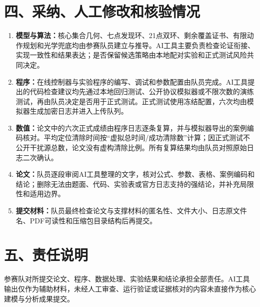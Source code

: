 \documentclass[UTF8,a4paper,zihao=-4,fontset=fandol]{ctexart}
\begin{document}
\section*{四、采纳、人工修改和核验情况}
\begin{enumerate}
\item \textbf{模型与算法：}核心集合几何、七点发现环、21点双环、剩余覆盖证书、有限动作规划和光学兜底均由参赛队员建立与推导。AI工具主要负责检查论证衔接、实现一致性和结果表达；是否保留候选策略由本地配对实验和正式测试风险共同决定。
\item \textbf{程序：}在线控制器与实验程序的编写、调试和参数配置由队员完成。AI工具提出的代码检查建议均先通过本地回归测试、公开协议模拟器或不限次数的演练测试，再由队员决定是否用于正式测试。正式测试使用冻结配置，六次均由模拟器生成加密日志并进入上传队列。
\item \textbf{数值：}论文中的六次正式成绩由程序日志逐条复算，并与模拟器导出的案例编码核对。平均定位清除时间按“虚拟总时间/成功清除数”计算；因正式测试不公开干扰源总数，论文没有虚构清除比例。所有复算结果均由队员对照原始日志二次确认。
\item \textbf{论文：}队员逐段审阅AI工具整理的文字，核对公式、参数、表格、案例编码和结论；删除无法由题面、代码、实验表或官方日志支持的强结论，并补充局限性和适用边界。
\item \textbf{提交材料：}队员最终检查论文与支撑材料的匿名性、文件大小、日志原文件名、PDF可读性和压缩包目录结构后再提交。
\end{enumerate}

\section*{五、责任说明}
参赛队对所提交论文、程序、数据处理、实验结果和结论承担全部责任。AI工具输出仅作为辅助材料，未经人工审查、运行验证或证据核对的内容未直接作为核心建模与分析成果提交。
\end{document}
